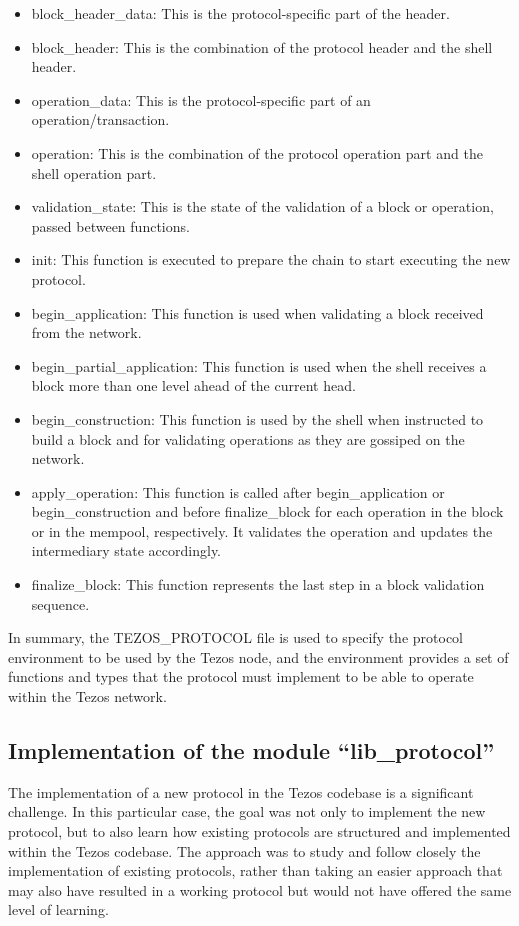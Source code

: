 \begin{itemize}
    \item block\_header\_data: This is the protocol-specific part of the header.
    \item block\_header: This is the combination of the protocol header and the shell header.
    \item operation\_data: This is the protocol-specific part of an operation/transaction.
    \item operation: This is the combination of the protocol operation part and the shell operation part.
    \item validation\_state: This is the state of the validation of a block or operation, passed between functions.
    \item init: This function is executed to prepare the chain to start executing the new protocol.
    \item begin\_application: This function is used when validating a block received from the network.
    \item begin\_partial\_application: This function is used when the shell receives a block more than one level ahead of the current head. 
    \item begin\_construction: This function is used by the shell when instructed to build a block and for validating operations as they are gossiped on the network.
    \item apply\_operation: This function is called after begin\_application or begin\_construction and before finalize\_block for each operation in the block or in the mempool, respectively. It validates the operation and updates the intermediary state accordingly.
    \item finalize\_block: This function represents the last step in a block validation sequence.
\end{itemize}

In summary, the TEZOS\_PROTOCOL file is used to specify the protocol environment to be used by the Tezos node, and the environment provides a set of functions and types that the protocol must implement to be able to operate within the Tezos network.

\subsection*{Implementation of the module ``lib\_protocol''}

The implementation of a new protocol in the Tezos codebase is a significant challenge.
In this particular case, the goal was not only to implement the new protocol, but to also learn how existing protocols are structured and implemented within the Tezos codebase. The approach was to study and follow closely the implementation of existing protocols, rather than taking an easier approach that may also have resulted in a working protocol but would not have offered the same level of learning.

